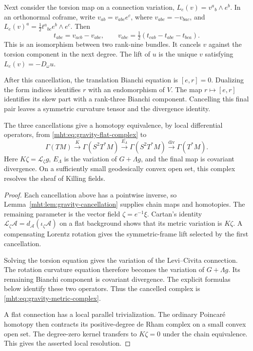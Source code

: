 Next consider the torsion map on a connection variation,
$L_e(v)=v^a{}_b\wedge e^b$.
In an orthonormal coframe, write
$v_{ab}=v_{abc}e^c$, where $v_{abc}=-v_{bac}$, and
$L_e(v)^a=\frac12t^a{}_{bc}e^b\wedge e^c$.
Then
\begin{equation}\label{mht:eq:gravity-torsion-inverse}
 t_{abc}=v_{acb}-v_{abc},
 \qquad
 v_{abc}=\tfrac12(t_{cab}-t_{abc}-t_{bca}).
\end{equation}
This is an isomorphism between two rank-nine bundles.
It cancels $v$ against the torsion component in the next degree.
The lift of $u$ is the unique $v$ satisfying
$L_e(v)=-D_\omega u$.

After this cancellation, the translation Bianchi equation is
$[e,r]=0$.
Dualizing the form indices identifies $r$ with an endomorphism
of $V$. The map $r\mapsto[e,r]$ identifies its skew part with
a rank-three Bianchi component.
Cancelling this final pair leaves a symmetric curvature tensor
and the divergence identity.

\begin{theorem}\label{mht:thm:gravity-metric-complex}
The three cancellations give a homotopy equivalence, by local
differential operators, from \eqref{mht:eq:gravity-flat-complex} to
\begin{equation}\label{mht:eq:gravity-metric-complex}
 \Gamma(TM)\xrightarrow{K}\Gamma(S^2T^*M)
 \xrightarrow{E_\Lambda}\Gamma(S^2T^*M)
 \xrightarrow{\operatorname{div}}\Gamma(T^*M).
\end{equation}
Here $K\zeta=\mathcal L_\zeta g$, $E_\Lambda$ is the variation
of $G+\Lambda g$, and the final map is covariant divergence.
On a sufficiently small geodesically convex open set, this complex
resolves the sheaf of Killing fields.
\end{theorem}

\begin{proof}
Each cancellation above has a pointwise inverse, so
Lemma~\ref{mht:lem:gravity-cancellation} supplies chain maps and
homotopies. The remaining parameter is the vector field
$\zeta=e^{-1}\xi$.
Cartan's identity
$\mathcal L_\zeta\mathcal A=d_{\mathcal A}(\iota_\zeta\mathcal A)$
on a flat background shows that its metric variation is $K\zeta$.
A compensating Lorentz rotation gives the symmetric-frame lift
selected by the first cancellation.

Solving the torsion equation gives the variation of the
Levi--Civita connection. The rotation curvature equation therefore
becomes the variation of $G+\Lambda g$.
Its remaining Bianchi component is covariant divergence.
The explicit formulas below identify these two operators.
Thus the cancelled complex is \eqref{mht:eq:gravity-metric-complex}.

A flat connection has a local parallel trivialization.
The ordinary Poincar\'e homotopy then contracts its positive-degree
de Rham complex on a small convex open set.
The degree-zero kernel transfers to $K\zeta=0$ under the chain
equivalence. This gives the asserted local resolution.
\end{proof}

